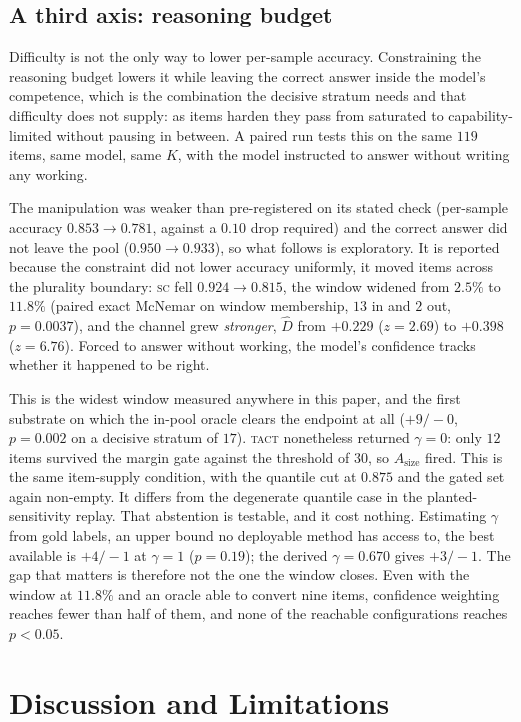 \documentclass[conference]{IEEEtran}
\newcommand{\Dhat}{\widehat{D}}
\newcommand{\SC}{\textsc{sc}}
\newcommand{\TACT}{\textsc{tact}}
\begin{document}
\subsection{A third axis: reasoning budget}\label{sec:budget}
Difficulty is not the only way to lower per-sample accuracy. Constraining the
reasoning budget lowers it while leaving the correct answer inside the model's
competence, which is the combination the decisive stratum needs and that
difficulty does not supply: as items harden they pass from saturated to
capability-limited without pausing in between. A paired run tests this on the
same $119$ items, same model, same $K$, with the model instructed to answer
without writing any working.

The manipulation was weaker than pre-registered on its stated check
(per-sample accuracy $0.853\to0.781$, against a $0.10$ drop required) and the
correct answer did not leave the pool ($0.950\to0.933$), so what follows is
exploratory. It is reported because the constraint did not lower accuracy
uniformly, it moved items across the plurality boundary: \SC{} fell $0.924\to
0.815$, the window widened from $2.5\%$ to $11.8\%$ (paired exact McNemar on
window membership, $13$ in and $2$ out, $p=0.0037$), and the channel grew
\emph{stronger}, $\Dhat$ from $+0.229$ ($z=2.69$) to $+0.398$ ($z=6.76$).
Forced to answer without working, the model's confidence tracks whether it
happened to be right.

This is the widest window measured anywhere in this paper, and the first
substrate on which the in-pool oracle clears the endpoint at all ($+9/-0$,
$p=0.002$ on a decisive stratum of $17$). \TACT{} nonetheless returned
$\gamma=0$: only $12$ items survived the margin gate against the threshold of
$30$, so $A_{\mathrm{size}}$ fired. This is the same item-supply condition,
with the quantile cut at $0.875$ and the gated set again non-empty. It differs
from the degenerate quantile case in the planted-sensitivity replay. That abstention is testable,
and it cost nothing. Estimating $\gamma$ from gold labels, an upper bound no
deployable method has access to, the best available is $+4/-1$ at $\gamma=1$
($p=0.19$); the derived $\gamma=0.670$ gives $+3/-1$. The gap that matters is
therefore not the one the window closes. Even with the window at $11.8\%$ and
an oracle able to convert nine items, confidence weighting reaches fewer than
half of them, and none of the reachable configurations reaches $p<0.05$.

\section{Discussion and Limitations}\label{sec:limits}
\end{document}
